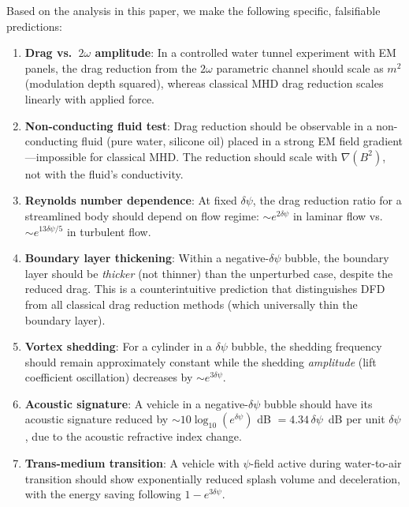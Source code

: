 \documentclass[12pt,twocolumn]{article}
\newcommand{\dpsi}{\delta\psi}
\begin{document}
Based on the analysis in this paper, we make the following specific,
falsifiable predictions:

\begin{enumerate}
\item \textbf{Drag vs.\ $2\omega$ amplitude}: In a controlled water tunnel
  experiment with EM panels, the drag reduction from the $2\omega$ parametric
  channel should scale as $m^2$ (modulation depth squared), whereas classical
  MHD drag reduction scales linearly with applied force.

\item \textbf{Non-conducting fluid test}: Drag reduction should be observable
  in a non-conducting fluid (pure water, silicone oil) placed in a strong
  EM field gradient---impossible for classical MHD. The reduction should
  scale with $\nabla(B^2)$, not with the fluid's conductivity.

\item \textbf{Reynolds number dependence}: At fixed $\dpsi$, the drag
  reduction ratio for a streamlined body should depend on flow regime:
  $\sim e^{2\dpsi}$ in laminar flow vs.\ $\sim e^{13\dpsi/5}$ in turbulent
  flow.

\item \textbf{Boundary layer thickening}: Within a negative-$\dpsi$ bubble,
  the boundary layer should be \emph{thicker} (not thinner) than the
  unperturbed case, despite the reduced drag. This is a counterintuitive
  prediction that distinguishes DFD from all classical drag reduction methods
  (which universally thin the boundary layer).

\item \textbf{Vortex shedding}: For a cylinder in a $\dpsi$ bubble, the
  shedding frequency should remain approximately constant while the shedding
  \emph{amplitude} (lift coefficient oscillation) decreases by $\sim e^{3\dpsi}$.

\item \textbf{Acoustic signature}: A vehicle in a negative-$\dpsi$ bubble
  should have its acoustic signature reduced by $\sim 10\log_{10}(e^{\dpsi})$
  dB $= 4.34\,\dpsi$~dB per unit $\dpsi$, due to the acoustic refractive
  index change.

\item \textbf{Trans-medium transition}: A vehicle with $\psi$-field
  active during water-to-air transition should show exponentially reduced
  splash volume and deceleration, with the energy saving following
  $1 - e^{3\dpsi}$.


\end{enumerate}
\end{document}
